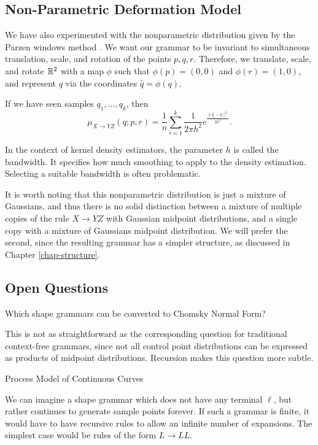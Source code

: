 \subsection{Non-Parametric Deformation Model}

We have also experimented with the nonparametric distribution given by
the Parzen windows method \cite{parzen}. We want our grammar to be
invariant to simultaneous translation, scale, and rotation of the
points $p,q,r$. Therefore, we translate, scale, and rotate $\mathbb{R}^2$
with a map $\phi$ such that $\phi(p) =(0,0)$ and $\phi(r) =(1,0)$, and
represent $q$ via the coordinates $\widehat{q} = \phi(q)$.

If we have seen samples $q_1, \dots, q_k$, then
$$\mu_{X\to YZ}(q ; p, r) = \frac{1}{n} \sum_{i=1}^{k}
\frac{1}{2\pi h^2} e^{\frac{\| \widehat{q_i} - \widehat{q}\|^2}{2h^2}}.$$

In the context of kernel density estimators, the parameter $h$ is
called the bandwidth. It specifies how much smoothing to apply to the
density estimation. Selecting a suitable bandwidth is often
problematic. 

It is worth noting that this nonparametric distribution is just a
mixture of Gaussians, and thus there is no solid distinction between a
mixture of multiple copies of the rule $X\to YZ$ with Gaussian
midpoint distributions, and a single copy with a mixture of Gaussians
midpoint distribution. We will prefer the second, since the resulting
grammar has a simpler structure, as discussed in Chapter \ref{chap-structure}.


\subsection{Open Questions}

Which shape grammars can be converted to Chomsky Normal Form?

This is not as straightforward as the corresponding question for
traditional context-free grammars, since not all control point
distributions can be expressed as products of midpoint
distributions. Recursion makes this question more subtle.

\newthought
Process Model of Continuous Curves

We can imagine a shape grammar which does not have any terminal
$\ell$, but rather continues to generate sample points forever. If
such a grammar is finite, it would have to have recursive rules to
allow an infinite number of expansions. The simplest case would be
rules of the form $L\to LL$.

